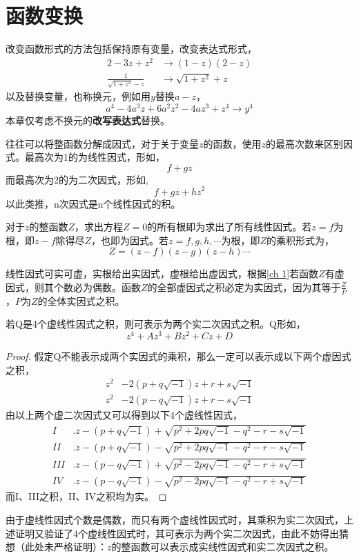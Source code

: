 \chapter{函数变换}\label{ch 2}
\begin{note}
改变函数形式的方法包括保持原有变量，改变表达式形式，
\begin{align*}
    2 - 3z + z^2 &\rightarrow (1-z)(2-z)\\
    \frac{1}{\sqrt{1 + z^2} - z} &\rightarrow \sqrt{1 + z^2} + z
\end{align*}
以及替换变量，也称换元，例如用$y$替换$a-z$，$$a^4 - 4a^3z + 6a^2z^2 - 4az^3 + z^4 \rightarrow y^4$$
本章仅考虑不换元的\textbf{改写表达式}替换。

往往可以将整函数分解成因式，对于关于变量$z$的函数，使用$z$的最高次数来区别因式。最高次为1的为线性因式，形如，
$$f + gz$$
而最高次为2的为二次因式，形如,
$$f + gz + hz^2$$
以此类推，n次因式是n个线性因式的积。

对于$z$的整函数$Z$，求出方程$Z=0$的所有根即为求出了所有线性因式。若$z=f$为根，即$z-f$除得尽$Z$，也即为因式。若$z = f,g,h,\cdots$为根，即$Z$的乘积形式为，
$$Z = (z-f)(z-g)(z-h)\cdots$$

线性因式可实可虚，实根给出实因式，虚根给出虚因式，根据\autoref{ch 1}若函数$Z$有虚因式，则其个数必为偶数。函数$Z$的全部虚因式之积必定为实因式，因为其等于$\frac{Z}{P}$，$P$为$Z$的全体实因式之积。

若Q是4个虚线性因式之积，则可表示为两个实二次因式之积。Q形如，
$$z^4 + Az^3 + Bz^2 + Cz + D$$

\begin{proof}
假定Q不能表示成两个实因式的乘积，那么一定可以表示成以下两个虚因式之积，
\begin{align*}
    z^2 &- 2(p + q \sqrt{-1})z + r + s\sqrt{-1}\\
    z^2 &- 2(p - q \sqrt{-1})z + r - s\sqrt{-1}
\end{align*}
由以上两个虚二次因式又可以得到以下4个虚线性因式，
\begin{align*}
    I&.z - (p + q \sqrt{-1}) + \sqrt{p^2 + 2pq\sqrt{-1} - q^2 - r - s\sqrt{-1}}\\
    II&.z - (p + q \sqrt{-1}) - \sqrt{p^2 + 2pq\sqrt{-1} - q^2 - r - s\sqrt{-1}}\\
    III&.z - (p - q \sqrt{-1}) + \sqrt{p^2 - 2pq\sqrt{-1} - q^2 - r + s\sqrt{-1}}\\
    IV&.z - (p - q \sqrt{-1}) - \sqrt{p^2 - 2pq\sqrt{-1} - q^2 - r + s\sqrt{-1}}
\end{align*}
而I、III之积，II、IV之积均为实。
\end{proof}

由于虚线性因式个数是偶数，而只有两个虚线性因式时，其乘积为实二次因式，上述证明又验证了4个虚线性因式时，其可表示为两个实二次因式，由此不妨得出猜想（此处未严格证明）：$z$的整函数可以表示成实线性因式和实二次因式之积。
\end{note}
